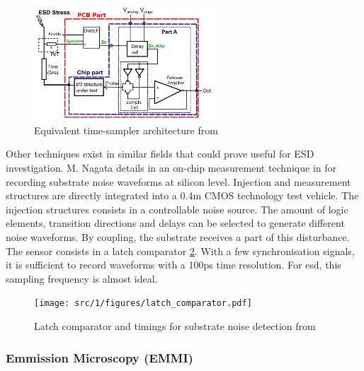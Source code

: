 \begin{figure}[!h]
  \centering
  \includegraphics[width=0.6\textwidth]{src/1/figures/architecture_equivalent_time_sampler.png}
  \caption{Equivalent time-sampler architecture from \cite{eq-time-sampling}}
  \label{fig:eq-time-sampler-architecture}
\end{figure}

Other techniques exist in similar fields that could prove useful for ESD investigation.
M. Nagata details in \cite{substrate-noise-measurement} an on-chip measurement technique in for recording substrate noise waveforms at silicon level.
Injection and measurement structures are directly integrated into a 0.4\textMu{}m CMOS technology test vehicle.
The injection structures consists in a controllable noise source.
The amount of logic elements, transition directions and delays can be selected to generate different noise waveforms.
By coupling, the substrate receives a part of this disturbance.
The sensor consists in a latch comparator \ref{fig:noise-detect-latch-comparator}.
With a few synchronisation signals, it is sufficient to record waveforms with a 100ps time resolution.
For \gls{esd}, this sampling frequency is almost ideal.

\begin{figure}[!h]
  \centering
  \texttt{[image: src/1/figures/latch\_comparator.pdf]}
  \caption{Latch comparator and timings for substrate noise detection from \cite{}}
  \label{fig:noise-detect-latch-comparator}
\end{figure}


\subsubsection{Emmission Microscopy (EMMI)}

